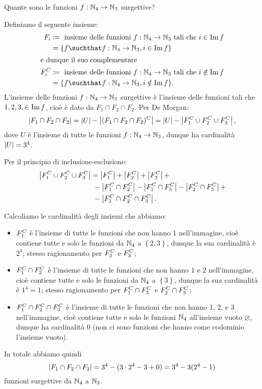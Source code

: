 \begin{example}
    Quante sono le funzioni $f : \mathbb{N}_4 \to \mathbb{N}_3$ surgettive?
\end{example}
\begin{solution}
    Definiamo il seguente insieme: 
    \begin{alignat*}{1}
        F_i &\coloneqq \text{ insieme delle funzioni $f : \N_4 \to \N_3$ tali che $i \in \Imm{f}$} \\
        &= \{ f \suchthat f : \N_4 \to \N_3, i \in \Imm{f}\}\\
        \intertext{e dunque il suo complementare}
        \compl{F_i} &\coloneqq \text{ insieme delle funzioni $f : \N_4 \to \N_3$ tali che $i \notin \Imm{f}$} \\
        &= \{ f \suchthat f : \N_4 \to \N_3, i \notin \Imm{f}\}.
    \end{alignat*}
    L'insieme delle funzioni $f : \mathbb{N}_4 \to \mathbb{N}_3$ surgettive è l'insieme delle funzioni tali che $1, 2, 3, \in \operatorname{Im} f$, cioè è dato da $F_1 \cap F_2 \cap F_2$. Per De Morgan: \[
        \left|F_1 \cap F_2 \cap F_2\right| = \left|U\right| - \left|(F_1 \cap F_2 \cap F_2)^C\right|  = \left|U\right| - \left|F_1^C \cup F_2^C \cup F_3^C\right|,
    \] dove $U$ è l'insieme di tutte le funzioni $f : \mathbb{N}_4 \to \mathbb{N}_3$, dunque ha cardinalità $\left|U\right| = 3^4$.

    Per il principio di inclusione-esclusione:
    \begin{alignat*}
        {1}
        \left|F_1^C \cup F_2^C \cup F_3^C\right| &= \left|F_1^C\right| + \left|F_2^C\right| + \left|F_3^C\right| +\\
        &\ - \left|F_1^C \cap F_2^C\right| - \left|F_1^C \cap F_3^C\right| - \left|F_2^C \cap F_3^C\right| + \\
        &\ - \left|F_1^C \cap F_2^C \cap F_3^C\right|.
    \end{alignat*}
\end{solution}

Calcoliamo le cardinalità degli insiemi che abbiamo:
\begin{itemize}
    \item $F_1^C$ è l'insieme di tutte le funzioni che non hanno $1$ nell'immagine, cioè contiene tutte e solo le funzioni da $\mathbb{N}_4$ a $\left\{ 2, 3\right\}$, dunque la sua cardinalità è $2^4$; stesso ragionamento per $F_2^C$ e $F_3^C$;
    \item $F_1^C \cap F_2^C$ è l'insieme di tutte le funzioni che non hanno $1$ e $2$ nell'immagine, cioè contiene tutte e solo le funzioni da $\mathbb{N}_4$ a $\left\{ 3\right\}$, dunque la sua cardinalità è $1^4 = 1$; stesso ragionamento per $F_1^C \cap F_3^C$ e $F_2^C \cap F_3^C$;
    \item $F_1^C \cap F_2^C \cap F_3^C$ è l'insieme di tutte le funzioni che non hanno 1, 2, e 3 nell'immagine, cioè contiene tutte e solo le funzioni $\mathbb{N}_4$ all'insieme vuoto $\varnothing$, dunque ha cardinalità 0 (non ci sono funzioni che hanno come codominio l'insieme vuoto).
\end{itemize}

In totale abbiamo quindi \[
    \left|F_1 \cap F_2 \cap F_2\right| = 3^4 - (3\cdot2^4 - 3 + 0) = 3^4 - 3(2^4 - 1)    
\] funzioni surgettive da $\mathbb{N}_4$ a $\mathbb{N}_3$.